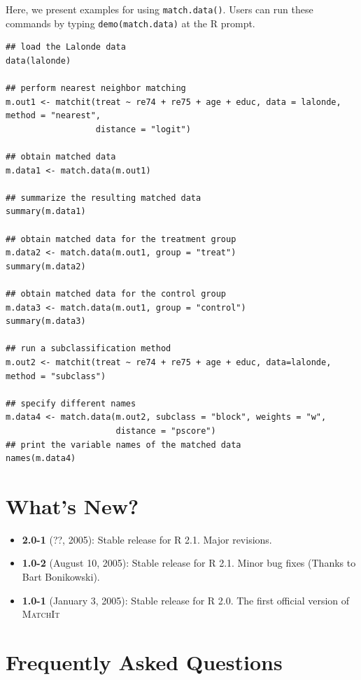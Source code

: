 \documentclass[oneside,letterpaper,titlepage]{article}
\newcommand{\MatchIt}{\textsc{MatchIt}}
\begin{document}
Here, we present examples for using {\tt match.data()}. Users can run
these commands by typing {\tt demo(match.data)} at the R prompt.
\begin{verbatim}
## load the Lalonde data
data(lalonde)

## perform nearest neighbor matching
m.out1 <- matchit(treat ~ re74 + re75 + age + educ, data = lalonde, method = "nearest",  
                  distance = "logit")

## obtain matched data 
m.data1 <- match.data(m.out1)

## summarize the resulting matched data
summary(m.data1)

## obtain matched data for the treatment group
m.data2 <- match.data(m.out1, group = "treat")
summary(m.data2)

## obtain matched data for the control group
m.data3 <- match.data(m.out1, group = "control")
summary(m.data3)

## run a subclassification method
m.out2 <- matchit(treat ~ re74 + re75 + age + educ, data=lalonde, method = "subclass")

## specify different names
m.data4 <- match.data(m.out2, subclass = "block", weights = "w",
                      distance = "pscore")
## print the variable names of the matched data
names(m.data4)
\end{verbatim}





\section{What's New?}

\begin{itemize}
\item \textbf{2.0-1} (??, 2005): Stable release for R 2.1. Major revisions.
\item \textbf{1.0-2} (August 10, 2005): Stable release for R
  2.1. Minor bug fixes (Thanks to Bart Bonikowski).
\item \textbf{1.0-1} (January 3, 2005): Stable release for R 2.0. The
  first official version of \MatchIt
\end{itemize}




\section{Frequently Asked Questions}
\end{document}
